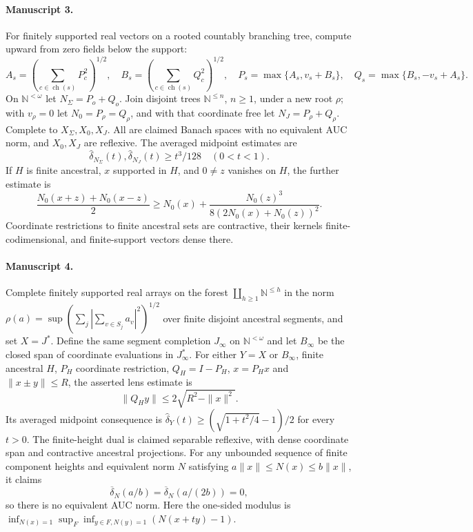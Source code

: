 \documentclass[11pt]{article}
\begin{document}
\paragraph{Manuscript 3.}
For finitely supported real vectors on a rooted countably branching tree, compute upward from zero fields below the support:
\[
 A_s=(\sum_{c\in\operatorname{ch}(s)}P_c^2)^{1/2},\quad
 B_s=(\sum_{c\in\operatorname{ch}(s)}Q_c^2)^{1/2},\quad
 P_s=\max\{A_s,v_s+B_s\},\quad Q_s=\max\{B_s,-v_s+A_s\}.
\]
On $\mathbb N^{<\omega}$ let $N_{\Sigma}=P_o+Q_o$. Join disjoint trees $\mathbb N^{\le n}$, $n\ge1$, under a new root $\rho$; with $v_{\rho}=0$ let $N_0=P_{\rho}=Q_{\rho}$, and with that coordinate free let $N_J=P_{\rho}+Q_{\rho}$. Complete to $X_{\Sigma},X_0,X_J$. All are claimed Banach spaces with no equivalent AUC norm, and $X_0,X_J$ are reflexive. The averaged midpoint estimates are
\[
 \widehat\delta_{N_{\Sigma}}(t),\widehat\delta_{N_J}(t)\ge t^3/128\quad(0<t<1).
\]
If $H$ is finite ancestral, $x$ supported in $H$, and $0\ne z$ vanishes on $H$, the further estimate is
\[
 \frac{N_0(x+z)+N_0(x-z)}2\ge N_0(x)+\frac{N_0(z)^3}{8(2N_0(x)+N_0(z))^2}.
\]
Coordinate restrictions to finite ancestral sets are contractive, their kernels finite-codimensional, and finite-support vectors dense there.

\paragraph{Manuscript 4.}
Complete finitely supported real arrays on the forest $\coprod_{h\ge1}\mathbb N^{\le h}$ in the norm $\rho(a)=\sup(\sum_j|\sum_{v\in S_j}a_v|^2)^{1/2}$ over finite disjoint ancestral segments, and set $X=J^*$. Define the same segment completion $J_{\infty}$ on $\mathbb N^{<\omega}$ and let $B_{\infty}$ be the closed span of coordinate evaluations in $J_{\infty}^*$. For either $Y=X$ or $B_{\infty}$, finite ancestral $H$, $P_H$ coordinate restriction, $Q_H=I-P_H$, $x=P_Hx$ and $\|x\pm y\|\le R$, the asserted lens estimate is
\[
 \|Q_Hy\|\le2\sqrt{R^2-\|x\|^2}.
\]
Its averaged midpoint consequence is $\widehat\delta_Y(t)\ge(\sqrt{1+t^2/4}-1)/2$ for every $t>0$. The finite-height dual is claimed separable reflexive, with dense coordinate span and contractive ancestral projections. For any unbounded sequence of finite component heights and equivalent norm $N$ satisfying $a\|x\|\le N(x)\le b\|x\|$, it claims
\[
 \overline\delta_N(a/b)=\overline\delta_N(a/(2b))=0,
\]
so there is no equivalent AUC norm. Here the one-sided modulus is $\inf_{N(x)=1}\sup_F\inf_{y\in F,N(y)=1}(N(x+ty)-1)$.
\end{document}
